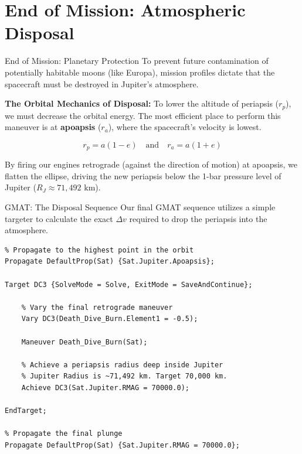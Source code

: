 \documentclass[11pt]{beamer}
\begin{document}
\section{End of Mission: Atmospheric Disposal}

\begin{frame}{End of Mission: Planetary Protection}
    To prevent future contamination of potentially habitable moons (like Europa), mission profiles dictate that the spacecraft must be destroyed in Jupiter's atmosphere.
    
    \vspace{0.3cm}
    \textbf{The Orbital Mechanics of Disposal:}
    To lower the altitude of periapsis ($r_p$), we must decrease the orbital energy. The most efficient place to perform this maneuver is at \textbf{apoapsis} ($r_a$), where the spacecraft's velocity is lowest.
    
    \begin{equation}
        r_p = a(1-e) \quad \text{and} \quad r_a = a(1+e)
    \end{equation}
    
    By firing our engines retrograde (against the direction of motion) at apoapsis, we flatten the ellipse, driving the new periapsis below the 1-bar pressure level of Jupiter ($R_J \approx 71,492 \text{ km}$).
\end{frame}

\begin{frame}[fragile]{GMAT: The Disposal Sequence}
    Our final GMAT sequence utilizes a simple targeter to calculate the exact $\Delta v$ required to drop the periapsis into the atmosphere.
    
\begin{lstlisting}
% Propagate to the highest point in the orbit
Propagate DefaultProp(Sat) {Sat.Jupiter.Apoapsis};

Target DC3 {SolveMode = Solve, ExitMode = SaveAndContinue};
    
    % Vary the final retrograde maneuver
    Vary DC3(Death_Dive_Burn.Element1 = -0.5); 
    
    Maneuver Death_Dive_Burn(Sat);
    
    % Achieve a periapsis radius deep inside Jupiter
    % Jupiter Radius is ~71,492 km. Target 70,000 km.
    Achieve DC3(Sat.Jupiter.RMAG = 70000.0); 
    
EndTarget;

% Propagate the final plunge
Propagate DefaultProp(Sat) {Sat.Jupiter.RMAG = 70000.0};
\end{lstlisting}
\end{frame}
\end{document}
